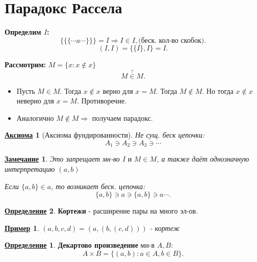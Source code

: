 \documentclass[12pt]{article}
\newtheorem{axiom}{\underline{Аксиома}}[section]
\newtheorem*{note}{\underline{Замечание}}
\newtheorem*{example}{\underline{Пример}}
\theoremstyle{definition}
\newtheorem{definition}{\underline{Определение}}[section]
\theoremstyle{definition}
\begin{document}
\section{Парадокс Рассела}
\textbf{Определим $I$:}
\[
\{\{\{\cdots a\cdots \}\}\} = I \Rightarrow I \in I, \text{(беск. кол-во скобок)}
.\] 
\[
    (I, I) = \{\{I\}, I\} = I
.\] 

\textbf{Рассмотрим:} $M = \{x \colon x \not\in x\}$
\[
    M \overset{\text{?}}{\in } M
.\] 
\begin{itemize}
    \item Пусть $M \in M$. Тогда $x \not\in x$ верно для $x = M$. Тогда $M \not\in M$. Но тогда $x \not\in x$ неверно для $x = M$. Противоречие.
    \item Аналогично  $M \not\in M \Rightarrow $ получаем парадокс.
\end{itemize}

\begin{axiom} [Аксиома фундированности]
    Не сущ. беск цепочки:
    \[
        A_1 \ni A_2 \ni A_3 \ni \cdots
    \]
\end{axiom}
\begin{note}
Это запрещает мн-во $I \text{ и } M \in M$, а также даёт однозначную интерпретацию $(a, b)$ 

Если $\{a, b\} \in a$, то возникает беск. цепочка:
\[
\{a, b\} \ni a \ni \{a, b\} \ni a \cdots 
.\] 
\end{note}

\begin{definition}
\textbf{Кортежи} - расширение пары на много эл-ов.
\begin{example}
$(a, b, c, d) = (a, (b, (c, d)))$ - кортеж
\end{example}

\begin{definition}
\textbf{Декартово произведение} мн-в $A, B$:
 \[
A\times B = \{(a, b) \colon a \in A, b \in B\}
.\] 
\end{definition}


\end{definition}
\end{document}
